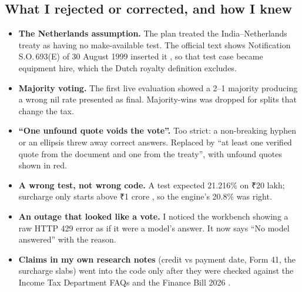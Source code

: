 \documentclass[10pt,a4paper]{article}
\begin{document}
\subsection{What I rejected or corrected, and how I knew}
\begin{itemize}
  \item \textbf{The Netherlands assumption.} The plan treated the India--Netherlands treaty as having no make-available test. The official text shows Notification S.O.\,693(E) of 30 August 1999 inserted it \cite{nl}, so that test case became equipment hire, which the Dutch royalty definition excludes.
  \item \textbf{Majority voting.} The first live evaluation showed a 2--1 majority producing a wrong nil rate presented as final. Majority-wins was dropped for splits that change the tax.
  \item \textbf{``One unfound quote voids the vote''.} Too strict: a non-breaking hyphen or an ellipsis threw away correct answers. Replaced by ``at least one verified quote from the document and one from the treaty'', with unfound quotes shown in red.
  \item \textbf{A wrong test, not wrong code.} A test expected 21.216\% on ₹20 lakh; surcharge only starts above ₹1 crore \cite{fb}, so the engine's 20.8\% was right.
  \item \textbf{An outage that looked like a vote.} I noticed the workbench showing a raw HTTP 429 error as if it were a model's answer. It now says ``No model answered'' with the reason.
  \item \textbf{Claims in my own research notes} (credit vs payment date, Form 41, the surcharge slabs) went into the code only after they were checked against the Income Tax Department FAQs and the Finance Bill 2026 \cite{faqtds,faqforms,form41,fb}.
\end{itemize}
\end{document}
